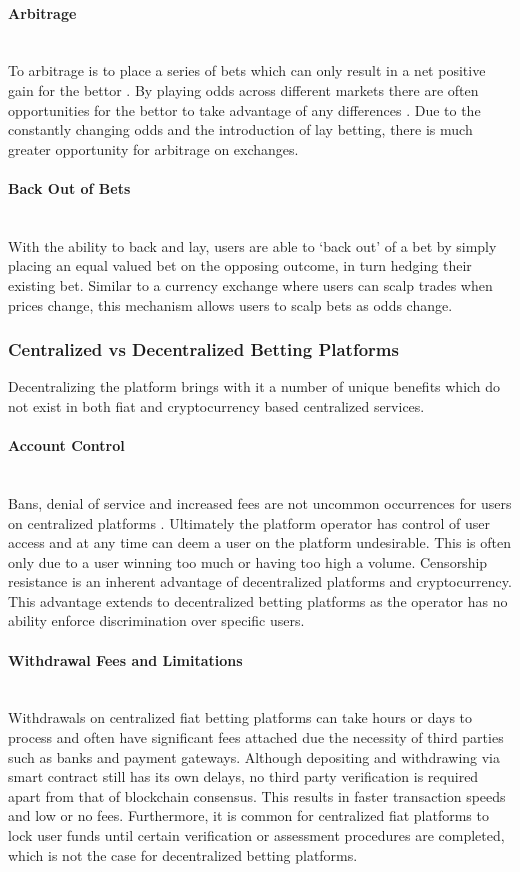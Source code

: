 \documentclass{article}
\newcommand{\myparagraph}[1]{\paragraph{#1}\mbox{}\\ \newline}
\begin{document}
				\myparagraph{Arbitrage} \label{arbitrage}
To arbitrage is to place a series of bets which can only result in a net positive gain for the bettor \cite{arbitrage}. By playing odds across different markets there are often opportunities for the bettor to take advantage of any differences \cite{arbitrage_1}. Due to the constantly changing odds and the introduction of lay betting, there is much greater opportunity for arbitrage on exchanges.
				
				\newpage
				\myparagraph{Back Out of Bets} \label{back-out-of-bets}
With the ability to back and lay, users are able to ‘back out’ of a bet by simply placing an equal valued bet on the opposing outcome, in turn hedging their existing bet. Similar to a currency exchange where users can scalp trades when prices change, this mechanism allows users to scalp bets as odds change.

			\subsubsection{Centralized vs Decentralized Betting Platforms} \label{centralized-vs-decentralized}
Decentralizing the platform brings with it a number of unique benefits which do not exist in both fiat and cryptocurrency based centralized services.

				\myparagraph{Account Control} \label{account-control}
Bans, denial of service and increased fees are not uncommon occurrences for users on centralized platforms \cite{banning}. Ultimately the platform operator has control of user access and at any time can deem a user on the platform undesirable. This is often only due to a user winning too much or having too high a volume. Censorship resistance is an inherent advantage of decentralized platforms and cryptocurrency. This advantage extends to decentralized betting platforms as the operator has no ability enforce discrimination over specific users.

				\myparagraph{Withdrawal Fees and Limitations} \label{withdrawal-fees-and-limitations}
Withdrawals on centralized fiat betting platforms can take hours or days to process and often have significant fees attached due the necessity of third parties such as banks and payment gateways. Although depositing and withdrawing via smart contract still has its own delays, no third party verification is required apart from that of blockchain consensus. This results in faster transaction speeds and low or no fees. Furthermore, it is common for centralized fiat platforms to lock user funds until certain verification or assessment procedures are completed, which is not the case for decentralized betting platforms.
\end{document}
